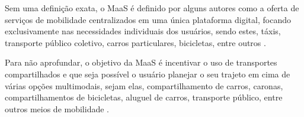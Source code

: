 Sem uma definição exata, o MaaS é definido por alguns autores como a oferta de serviços de mobilidade centralizados em uma única plataforma digital, focando exclusivamente nas necessidades individuais dos usuários, sendo estes, táxis, transporte público coletivo, carros particulares, bicicletas, entre outros \cite{jittrapirom, kamargianni, mulley}.

Para não aprofundar, o objetivo da MaaS é incentivar o uso de transportes compartilhados e que seja possível o usuário planejar o seu trajeto em cima de várias opções multimodais, sejam elas, compartilhamento de carros, caronas, compartilhamentos de bicicletas, aluguel de carros, transporte público, entre outros meios de mobilidade \cite{jittrapirom}. 

